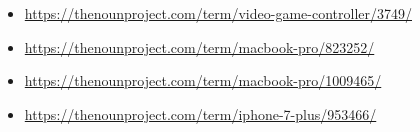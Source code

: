 \begin{itemize}
\tightlist
\item
  \url{https://thenounproject.com/term/video-game-controller/3749/}
\item
  \url{https://thenounproject.com/term/macbook-pro/823252/}
\item
  \url{https://thenounproject.com/term/macbook-pro/1009465/}
\item
  \url{https://thenounproject.com/term/iphone-7-plus/953466/}
\end{itemize}
